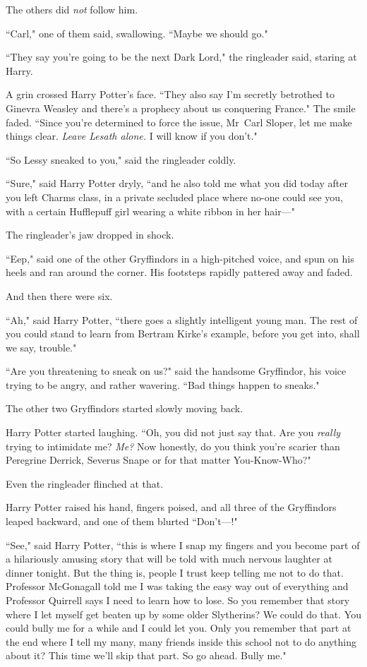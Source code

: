 The others did \emph{not} follow him.

``Carl," one of them said, swallowing. ``Maybe we should go."

``They say you're going to be the next Dark Lord," the ringleader said, staring at Harry.

A grin crossed Harry Potter's face. ``They also say I'm secretly betrothed to Ginevra Weasley and there's a prophecy about us conquering France." The smile faded. ``Since you're determined to force the issue, Mr~Carl Sloper, let me make things clear. \emph{Leave Lesath alone.} I will know if you don't."

``So Lessy sneaked to you," said the ringleader coldly.

``Sure," said Harry Potter dryly, ``and he also told me what you did today after you left Charms class, in a private secluded place where no-one could see you, with a certain Hufflepuff girl wearing a white ribbon in her hair—"

The ringleader's jaw dropped in shock.

``Eep," said one of the other Gryffindors in a high-pitched voice, and spun on his heels and ran around the corner. His footsteps rapidly pattered away and faded.

And then there were six.

``Ah," said Harry Potter, ``there goes a slightly intelligent young man. The rest of you could stand to learn from Bertram Kirke's example, before you get into, shall we say, trouble."

``Are you threatening to sneak on us?" said the handsome Gryffindor, his voice trying to be angry, and rather wavering. ``Bad things happen to sneaks."

The other two Gryffindors started slowly moving back.

Harry Potter started laughing. ``Oh, you did not just say that. Are you \emph{really} trying to intimidate me? \emph{Me?} Now honestly, do you think you're scarier than Peregrine Derrick, Severus Snape or for that matter You-Know-Who?"

Even the ringleader flinched at that.

Harry Potter raised his hand, fingers poised, and all three of the Gryffindors leaped backward, and one of them blurted ``Don't—!"

``See," said Harry Potter, ``this is where I snap my fingers and you become part of a hilariously amusing story that will be told with much nervous laughter at dinner tonight. But the thing is, people I trust keep telling me not to do that. Professor McGonagall told me I was taking the easy way out of everything and Professor Quirrell says I need to learn how to lose. So you remember that story where I let myself get beaten up by some older Slytherins? We could do that. You could bully me for a while and I could let you. Only you remember that part at the end where I tell my many, many friends inside this school not to do anything about it? This time we'll skip that part. So go ahead. Bully me."

